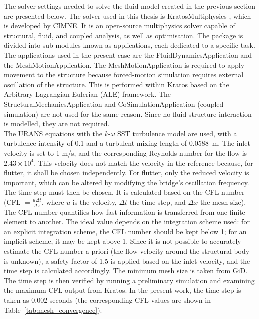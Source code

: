 \documentclass[../main]{subfiles}
\begin{document}
The solver settings needed to solve the fluid model created in the previous section are presented below. The solver used in this 
thesis is KratosMultiphysics \cite{dadvand2010, Kratos}, which is developed by CIMNE. It is an open-source multiphysics solver 
capable of structural, fluid, and coupled analysis, as well as optimisation. The package is divided into sub-modules known 
as applications, each dedicated to a specific task. The applications used in the present case are the FluidDynamicsApplication 
and the MeshMotionApplication. The MeshMotionApplication 
is required to apply movement to the structure because forced-motion simulation requires external oscillation of the structure. 
This is performed within Kratos based on the Arbitrary 
Lagrangian-Eulerian (ALE) framework. The StructuralMechanicsApplication and CoSimulationApplication (coupled simulation) are not used 
for the same reason. Since no fluid-structure interaction is modelled, they are not required. \\

The URANS equations with the $k$-$\omega$ SST turbulence model are used, with a turbulence intensity of 0.1 and a 
turbulent mixing length of 0.0588~m. The inlet velocity is set to 1 m/s, and the corresponding Reynolds number for the 
flow is $2.43 \times 10^4$. This velocity does not match the velocity in the reference \cite{sarkic2012} because, for flutter, it shall be chosen independently. 
For flutter, only the reduced velocity is important, which can be altered by modifying the bridge's oscillation frequency. 
The time step must then be chosen. It is calculated based on the CFL number 
(CFL $= \frac{u \Delta t}{\Delta x}$, where $u$ is the velocity, $\Delta t$ the time step, and $\Delta x$ the mesh size). 
The CFL number quantifies how fast information is transferred from one finite element to another. The ideal value depends 
on the integration scheme used: for an explicit integration scheme, the CFL number should be kept below 1; for an implicit 
scheme, it may be kept above 1. Since it is not possible to accurately estimate the CFL number a priori (the flow velocity 
around the structural body is unknown), a safety factor of 1.5 is applied based on the inlet velocity, and the time step is 
calculated accordingly. The minimum mesh size is taken from GiD. The time step is then verified by running a preliminary 
simulation and examining the maximum CFL output from Kratos. In the present work, the time step is taken as 0.002 seconds 
(the corresponding CFL values are shown in Table~\ref{tab:mesh_convergence}). \\
\end{document}
